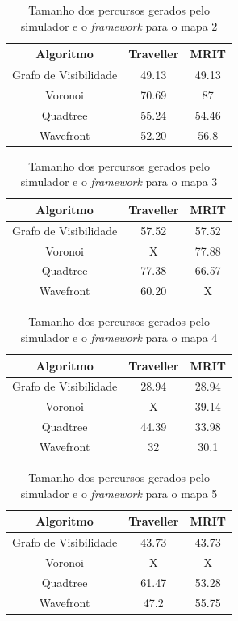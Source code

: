 \begin{table}[H]
	\centering
	\label{tab02}
	\caption{Tamanho dos percursos gerados pelo simulador e o \textit{framework} para o mapa 2}
	\begin{tabular}{ccc}
		\toprule
		\textbf{Algoritmo} & \textbf{Traveller} & \textbf{MRIT} \\
		\midrule
Grafo de Visibilidade & 49.13   & 49.13 \\
Voronoi 				  & 70.69   & 87 \\
Quadtree				  & 55.24   & 54.46 \\
Wavefront             & 52.20    & 56.8  \\
		\bottomrule
	\end{tabular}
\end{table}

\begin{table}[H]
	\centering
	\label{tab03}
	\caption{Tamanho dos percursos gerados pelo simulador e o \textit{framework} para o mapa 3}
	\begin{tabular}{ccc}
		\toprule
		\textbf{Algoritmo} & \textbf{Traveller} & \textbf{MRIT} \\
		\midrule
Grafo de Visibilidade & 57.52   & 57.52 \\
Voronoi 				  & X   		& 77.88 \\
Quadtree				  & 77.38   & 66.57 \\
Wavefront             & 60.20    & X  \\
		\bottomrule
	\end{tabular}
\end{table}

\begin{table}[H]
	\centering
	\label{tab04}
	\caption{Tamanho dos percursos gerados pelo simulador e o \textit{framework} para o mapa 4}
	\begin{tabular}{ccc}
		\toprule
		\textbf{Algoritmo} & \textbf{Traveller} & \textbf{MRIT} \\
		\midrule
Grafo de Visibilidade & 28.94   & 28.94 \\
Voronoi 				  & X       & 39.14 \\
Quadtree				  & 44.39   & 33.98 \\
Wavefront             & 32      & 30.1  \\
		\bottomrule
	\end{tabular}
\end{table}

\begin{table}[H]
	\centering
	\label{tab05}
	\caption{Tamanho dos percursos gerados pelo simulador e o \textit{framework} para o mapa 5}
	\begin{tabular}{ccc}
		\toprule
		\textbf{Algoritmo} & \textbf{Traveller} & \textbf{MRIT} \\
		\midrule
Grafo de Visibilidade & 43.73   & 43.73 \\
Voronoi 				  & X      & X \\
Quadtree				  & 61.47   & 53.28 \\
Wavefront             & 47.2    & 55.75  \\
		\bottomrule
	\end{tabular}
\end{table}

